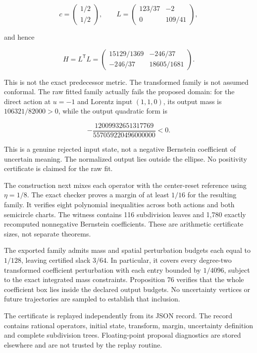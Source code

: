 \documentclass[11pt,letterpaper]{article}
\begin{document}
\[
c=\begin{pmatrix}1/2\\1/2\end{pmatrix},\qquad
L=\begin{pmatrix}123/37&-2\\0&109/41\end{pmatrix},
\]

and hence

\[
\boxed{
H=L^{\mathsf T}L=
\begin{pmatrix}15129/1369&-246/37\\-246/37&18605/1681\end{pmatrix}.
}
\]

This is not the exact predecessor metric. The transformed family is not
assumed conformal. The raw fitted family actually fails the proposed
domain: for the direct action at \(u=-1\) and Lorentz input \((1,1,0)\),
its output mass is \(106321/82000>0\), while the output quadratic form
is

\[
-\frac{12009932651317769}{557059220496000000}<0.
\]

This is a genuine rejected input state, not a negative Bernstein
coefficient of uncertain meaning. The normalized output lies outside the
ellipse. No positivity certificate is claimed for the raw fit.

The construction next mixes each operator with the center-reset
reference using \(\eta=1/8\). The exact checker proves a margin of at
least \(1/16\) for the resulting family. It verifies eight polynomial
inequalities across both actions and both semicircle charts. The witness
contains 116 subdivision leaves and 1,780 exactly recomputed nonnegative
Bernstein coefficients. These are arithmetic certificate sizes, not
separate theorems.

The exported family admits mass and spatial perturbation budgets each
equal to \(1/128\), leaving certified slack \(3/64\). In particular, it
covers every degree-two transformed coefficient perturbation with each
entry bounded by \(1/4096\), subject to the exact integrated mass
constraints. Proposition 76 verifies that the whole coefficient box lies
inside the declared output budgets. No uncertainty vertices or future
trajectories are sampled to establish that inclusion.

The certificate is replayed independently from its JSON record. The
record contains rational operators, initial state, transform, margin,
uncertainty definition and complete subdivision trees. Floating-point
proposal diagnostics are stored elsewhere and are not trusted by the
replay routine.
\end{document}
